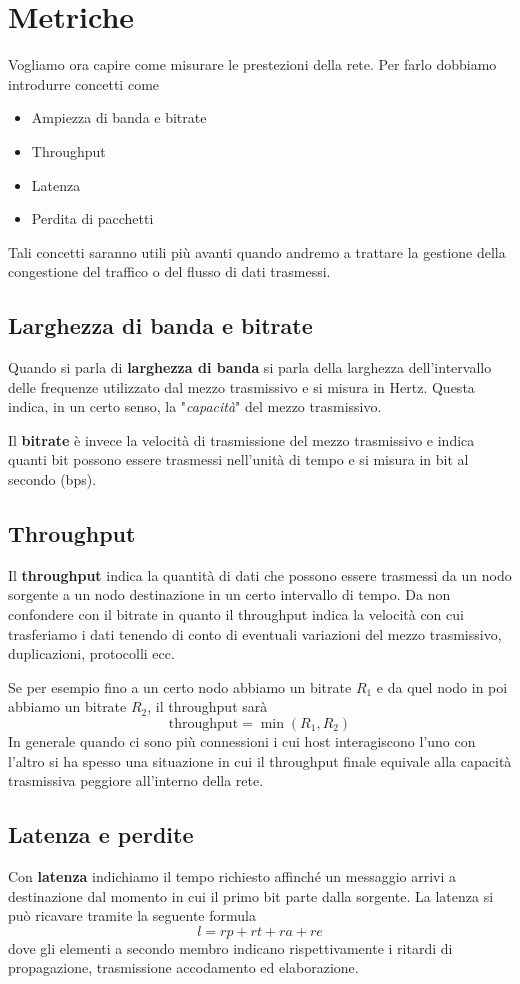 \section{Metriche}
Vogliamo ora capire come misurare le prestezioni della rete. Per farlo 
dobbiamo introdurre concetti come
\begin{itemize}
	\item Ampiezza di banda e bitrate
	\item Throughput
	\item Latenza
	\item Perdita di pacchetti
\end{itemize}
Tali concetti saranno utili più avanti quando andremo a trattare la
gestione della congestione del traffico o del flusso di dati 
trasmessi.

\subsection{Larghezza di banda e bitrate}
Quando si parla di \textbf{larghezza di banda} si parla della larghezza
dell'intervallo delle frequenze utilizzato dal mezzo trasmissivo e si 
misura in Hertz. Questa indica, in un certo senso, la "\emph{capacità}"
del mezzo trasmissivo.

Il \textbf{bitrate} è invece la velocità di trasmissione del mezzo 
trasmissivo e indica quanti bit possono essere trasmessi nell'unità 
di tempo e si misura in bit al secondo (bps).

\subsection{Throughput}
Il \textbf{throughput} indica la quantità di dati che possono essere 
trasmessi da un nodo sorgente a un nodo destinazione in un certo 
intervallo di tempo. Da non confondere con il bitrate in quanto il 
throughput indica la velocità con cui trasferiamo i dati tenendo di 
conto di eventuali variazioni del mezzo trasmissivo, duplicazioni, 
protocolli ecc.

Se per esempio fino a un certo nodo abbiamo un bitrate $R_1$ e da quel 
nodo in poi abbiamo un bitrate $R_2$, il throughput sarà
\[ \text{throughput} = \min (R_1, R_2) \]
In generale quando ci sono più connessioni i cui host interagiscono 
l'uno con l'altro si ha spesso una situazione in cui il throughput 
finale equivale alla capacità trasmissiva peggiore all'interno della 
rete.

\subsection{Latenza e perdite}
Con \textbf{latenza} indichiamo il tempo richiesto affinché un 
messaggio arrivi a destinazione dal momento in cui il primo bit parte 
dalla sorgente. La latenza si può ricavare tramite la seguente formula
\[ l = rp + rt + ra + re \]
dove gli elementi a secondo membro indicano rispettivamente i ritardi 
di propagazione, trasmissione accodamento ed elaborazione.

